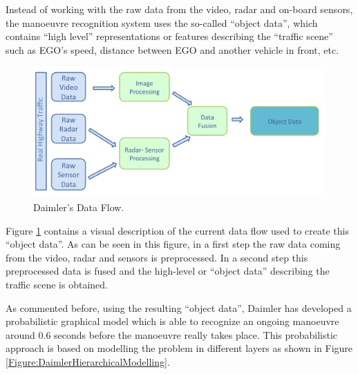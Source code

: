 Instead of working with the raw data from the video, radar and on-board sensors, the manoeuvre recognition system uses the so-called ``object data'', which contains ``high level'' representations or features describing the ``traffic scene'' such as EGO's speed, distance between EGO and another vehicle in front, etc.  
\begin{figure}
\begin{center}
\includegraphics[scale=0.35]{./figures/DaimlerDataFlow}
\caption{\label{Figure:DaimlerDataFlow} Daimler's Data Flow.}
\end{center}
\end{figure}

Figure \ref{Figure:DaimlerDataFlow} contains a visual description of the current data flow used to create this ``object data''.  As can be seen in this figure, in a first step the raw data coming from the video, radar and sensors is preprocessed. In a second step this preprocessed data is fused and the high-level or ``object data'' describing the traffic scene is obtained. 

As commented before, using the resulting ``object data'', Daimler has developed a probabilistic graphical model \cite{kasper2012object} which is able to recognize an ongoing manoeuvre around 0.6 seconds before the manoeuvre really takes place. This probabilistic approach is based on modelling the problem in different layers as shown in Figure \ref{Figure:DaimlerHierarchicalModelling}.



